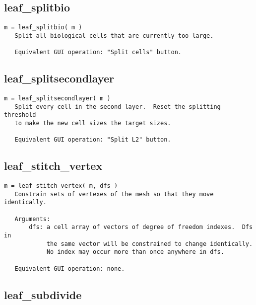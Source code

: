 \subsection{leaf\_splitbio}\label{section-leaf-splitbio}

\begin{verbatim}
m = leaf_splitbio( m )
   Split all biological cells that are currently too large.

   Equivalent GUI operation: "Split cells" button.
\end{verbatim}

\subsection{leaf\_splitsecondlayer}\label{section-leaf-splitsecondlayer}

\begin{verbatim}
m = leaf_splitsecondlayer( m )
   Split every cell in the second layer.  Reset the splitting threshold
   to make the new cell sizes the target sizes.

   Equivalent GUI operation: "Split L2" button.
\end{verbatim}

\subsection{leaf\_stitch\_vertex}\label{section-leaf-stitch-vertex}

\begin{verbatim}
m = leaf_stitch_vertex( m, dfs )
   Constrain sets of vertexes of the mesh so that they move identically.

   Arguments:
       dfs: a cell array of vectors of degree of freedom indexes.  Dfs in
            the same vector will be constrained to change identically.
            No index may occur more than once anywhere in dfs.

   Equivalent GUI operation: none.
\end{verbatim}

\subsection{leaf\_subdivide}\label{section-leaf-subdivide}


